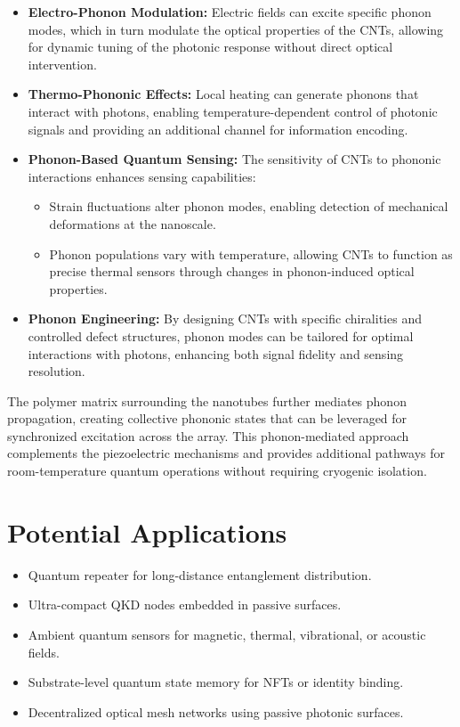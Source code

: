 \documentclass[11pt]{article}
\begin{document}
	\begin{itemize}
		\item \textbf{Electro-Phonon Modulation:} Electric fields can excite specific phonon modes, which in turn modulate the optical properties of the CNTs, allowing for dynamic tuning of the photonic response without direct optical intervention.
		
		\item \textbf{Thermo-Phononic Effects:} Local heating can generate phonons that interact with photons, enabling temperature-dependent control of photonic signals and providing an additional channel for information encoding.
		
		\item \textbf{Phonon-Based Quantum Sensing:} The sensitivity of CNTs to phononic interactions enhances sensing capabilities:
		\begin{itemize}
			\item Strain fluctuations alter phonon modes, enabling detection of mechanical deformations at the nanoscale.
			\item Phonon populations vary with temperature, allowing CNTs to function as precise thermal sensors through changes in phonon-induced optical properties.
		\end{itemize}
		
		\item \textbf{Phonon Engineering:} By designing CNTs with specific chiralities and controlled defect structures, phonon modes can be tailored for optimal interactions with photons, enhancing both signal fidelity and sensing resolution.
	\end{itemize}
	
	The polymer matrix surrounding the nanotubes further mediates phonon propagation, creating collective phononic states that can be leveraged for synchronized excitation across the array. This phonon-mediated approach complements the piezoelectric mechanisms and provides additional pathways for room-temperature quantum operations without requiring cryogenic isolation.
	
	\section{Potential Applications}
	\begin{itemize}
		\item Quantum repeater for long-distance entanglement distribution.
		\item Ultra-compact QKD nodes embedded in passive surfaces.
		\item Ambient quantum sensors for magnetic, thermal, vibrational, or acoustic fields.
		\item Substrate-level quantum state memory for NFTs or identity binding.
		\item Decentralized optical mesh networks using passive photonic surfaces.
	\end{itemize}
	
\end{document}
